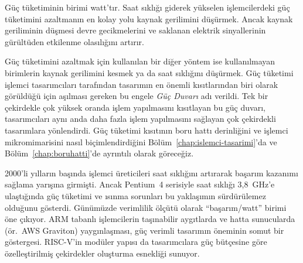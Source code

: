 Güç tüketiminin birimi watt'tır. Saat sıklığı giderek yükselen işlemcilerdeki güç tüketimini azaltmanın en kolay yolu kaynak gerilimini düşürmek. Ancak kaynak geriliminin düşmesi devre gecikmelerini ve saklanan elektrik sinyallerinin gürültüden etkilenme olasılığını artırır.

Güç tüketimini azaltmak için kullanılan bir diğer yöntem ise kullanılmayan birimlerin kaynak gerilimini kesmek ya da saat sıklığını düşürmek. Güç tüketimi işlemci tasarımcıları tarafından tasarımın en önemli kısıtlarından biri olarak görüldüğü için aşılması gereken bu engele \emph{Güç Duvarı} adı verildi. Tek bir çekirdekle çok yüksek oranda işlem yapılmasını kısıtlayan bu güç duvarı, tasarımcıları aynı anda daha fazla işlem yapılmasını sağlayan çok çekirdekli tasarımlara yönlendirdi. Güç tüketimi kısıtının boru hattı derinliğini ve işlemci mikromimarisini nasıl biçimlendirdiğini Bölüm~\ref{chap:islemci-tasarimi}'da ve Bölüm~\ref{chap:boruhatti}'de ayrıntılı olarak göreceğiz.

\begin{bilginot}
2000'li yılların başında işlemci üreticileri saat sıklığını artırarak başarım kazanımı sağlama yarışına girmişti. Ancak Pentium~4 serisiyle saat sıklığı 3{,}8~GHz'e ulaştığında güç tüketimi ve ısınma sorunları bu yaklaşımın sürdürülemez olduğunu gösterdi. Günümüzde verimlilik ölçütü olarak ``başarım/watt'' birimi öne çıkıyor. ARM tabanlı işlemcilerin taşınabilir aygıtlarda ve hatta sunucularda (ör.\ AWS Graviton) yaygınlaşması, güç verimli tasarımın öneminin somut bir göstergesi. RISC-V'in modüler yapısı da tasarımcılara güç bütçesine göre özelleştirilmiş çekirdekler oluşturma esnekliği sunuyor.
\end{bilginot}

